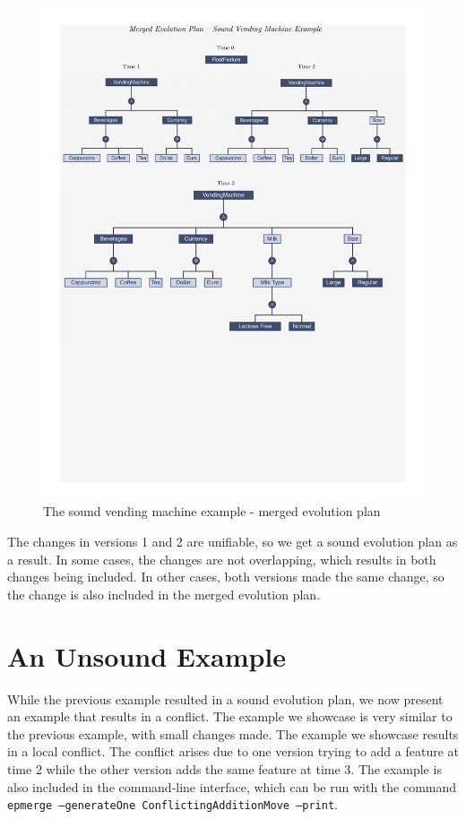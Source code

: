 \documentclass[a4paper,english]{ifimaster}
\begin{document}
\begin{figure}[htpb]
  \centering
  \includegraphics[width=\linewidth]{vending_machine/merged_sound.pdf}
  \caption{The sound vending machine example - merged evolution plan}%
  \label{fig:vending_machine_sound_merged_ep}
\end{figure}

The changes in versions 1 and 2 are unifiable, so we get a sound evolution plan as a result. In some cases, the changes are not overlapping, which results in both changes being included. In other cases, both versions made the same change, so the change is also included in the merged evolution plan.

\section{An Unsound Example}%
\label{sec:an_unsound_example}

While the previous example resulted in a sound evolution plan, we now present an example that results in a conflict. The example we showcase is very similar to the previous example, with small changes made. The example we showcase results in a local conflict. The conflict arises due to one version trying to add a feature at time 2 while the other version adds the same feature at time 3. The example is also included in the command-line interface, which can be run with the command \texttt{epmerge --generateOne ConflictingAdditionMove --print}.
\end{document}
